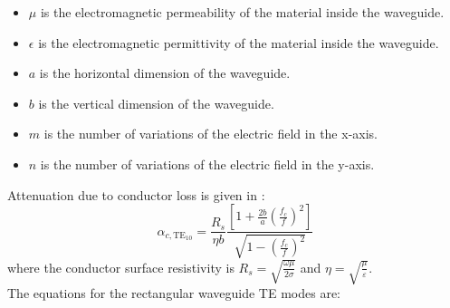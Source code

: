 \documentclass[english,twoside]{article}
\begin{document}
      \begin{itemize}
        \item $\mu$ is the electromagnetic permeability of the material inside the waveguide.
        \item $\epsilon$ is the electromagnetic permittivity of the material inside the waveguide.
        \item $a$ is the horizontal dimension of the waveguide.
        \item $b$ is the vertical dimension of the waveguide.
        \item $m$ is the number of variations of the electric field in the x-axis.
        \item $n$ is the number of variations of the electric field in the y-axis.
      \end{itemize}
  
  	Attenuation due to conductor loss is given in \cite{pozar}:
  	\begin{equation}
  		\alpha_{c,\textrm{TE}_\textrm{10}} = \frac{R_s}{\eta b}\frac{\left[1+\frac{2b}{a}\left(\frac{f_c}{f}\right)^2\right]}{\sqrt{1-\left(\frac{f_c}{f}\right)^2}}
  	\end{equation}
    where the conductor surface resistivity is $R_s=\sqrt{\frac{\omega\mu}{2\sigma}}$ and $\eta=\sqrt{\frac{\mu}{\varepsilon}}$.\\
    
      \noindent The equations for the rectangular waveguide \ac{TE} modes are:
      
\end{document}
